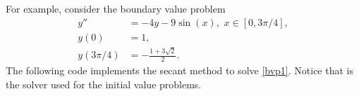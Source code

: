 For example, consider the boundary value problem
\begin{equation}
\begin{split}
\label{bvp1}
y'' &= -4y -9\sin(x), \,\, x \in [0,3\pi/4],\\
y(0) &= 1, \\
y(3 \pi/4) &= -\frac{1+3\sqrt{2}}{2}.
\end{split}
\end{equation}
The following code implements the secant method to solve \eqref{bvp1}.
Notice that  is the solver used for the initial value problems.




%
%


